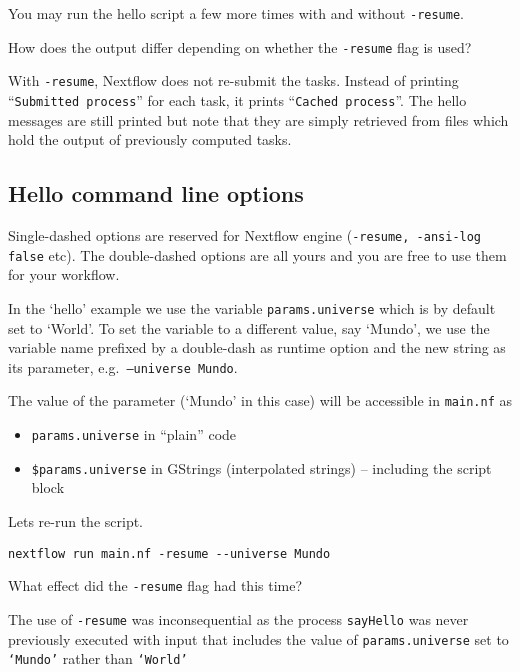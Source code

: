You may run the hello script a few more times with and without \texttt{-resume}.

\begin{questions}
How does the output differ depending on whether the \texttt{-resume} flag is used?
\begin{answer}
With \texttt{-resume}, Nextflow does not re-submit the tasks. Instead of printing ``\texttt{Submitted process}'' for each task, it prints ``\texttt{Cached process}''.
The hello messages are still printed but note that they are simply retrieved from files which hold the output of previously computed tasks. 
\end{answer}
\end{questions}

\newpage

\subsection{Hello command line options}

Single-dashed options are reserved for Nextflow engine (\texttt{-resume, -ansi-log false} etc). 
The double-dashed options are all yours and you are free to use them for your workflow. 

In the `hello' example we use the variable \texttt{params.universe} which is by default set to `World'.
To set the variable to a different value, say `Mundo', we use the variable name prefixed by a double-dash 
as runtime option and the new string as its parameter, e.g.\ \texttt{--universe Mundo}.

The value of the parameter (`Mundo' in this case) will be accessible in \texttt{main.nf} as 

\begin{itemize}
\item \texttt{params.universe} in ``plain'' code 
\item \texttt{\$params.universe} in GStrings (interpolated strings) -- including the script block
\end{itemize}


\begin{steps}

Lets re-run the script.

\begin{lstlisting}
nextflow run main.nf -resume --universe Mundo 
\end{lstlisting}
\end{steps}

\begin{questions}
What effect did the \texttt{-resume} flag had this time?
\begin{answer}
The use of \texttt{-resume} was inconsequential as the process \texttt{sayHello}
was never previously executed with input that includes the value of \texttt{params.universe} 
set to \texttt{`Mundo'} rather than \texttt{`World'}
\end{answer}
\end{questions}


